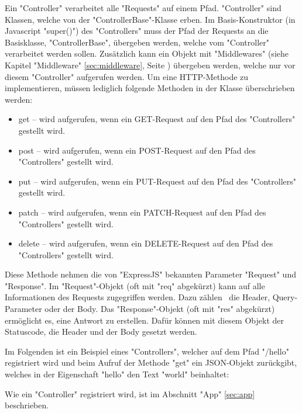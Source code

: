 \label{sec:controller}

Ein "Controller" verarbeitet alle "Requests" auf einem Pfad. 
"Controller" sind Klassen, welche von der "ControllerBase"-Klasse erben. 
Im Basis-Konstruktor (in Javascript "{\ttfamily super()}") des "Controllers" muss der Pfad der Requests an die Basisklasse, "ControllerBase", übergeben werden, welche vom "Controller" verarbeitet werden sollen. 
Zusätzlich kann ein Objekt mit "Middlewares" (siehe Kapitel "Middleware" \ref{sec:middleware}, Seite \pageref{sec:middleware}) übergeben werden, welche nur vor diesem "Controller" aufgerufen werden. 
Um eine HTTP-Methode zu implementieren, müssen lediglich folgende Methoden in der Klasse überschrieben werden:

\begin{itemize}
    \item {\ttfamily get} -- wird aufgerufen, wenn ein GET-Request auf den Pfad des "Controllers" gestellt wird.
    \item {\ttfamily post} -- wird aufgerufen, wenn ein POST-Request auf den Pfad des "Controllers" gestellt wird.
    \item {\ttfamily put} -- wird aufgerufen, wenn ein PUT-Request auf den Pfad des "Controllers" gestellt wird.
    \item {\ttfamily patch} -- wird aufgerufen, wenn ein PATCH-Request auf den Pfad des "Controllers" gestellt wird.
    \item {\ttfamily delete} -- wird aufgerufen, wenn ein DELETE-Request auf den Pfad des "Controllers" gestellt wird.
\end{itemize}

Diese Methode nehmen die von "ExpressJS" bekannten Parameter "Request" und "Response". 
Im "Request"-Objekt (oft mit "req" abgekürzt) kann auf alle Informationen des Requests zugegriffen werden. Dazu zählen \zb\ die Header, Query-Parameter oder der Body.
Das "Response"-Objekt (oft mit "res" abgekürzt) ermöglicht es, eine Antwort zu erstellen. Dafür können mit diesem Objekt der Statuscode, die Header und der Body gesetzt werden.


Im Folgenden ist ein Beispiel eines "Controllers", welcher auf dem Pfad "/hello" registriert wird und beim Aufruf der Methode "get" ein JSON-Objekt zurückgibt, welches in der Eigenschaft "hello" den Text "world" beinhaltet:


Wie ein "Controller" registriert wird, ist im Abschnitt "App" \ref{sec:app} beschrieben. 